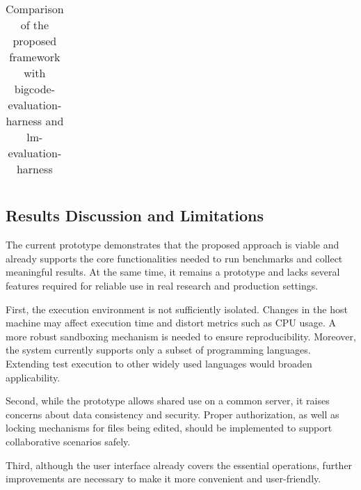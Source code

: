 \begin{longtable}{|p{2.3cm}|p{4.3cm}|p{4.3cm}|p{4.3cm}|}
\caption{Comparison of the proposed framework with bigcode-evaluation-harness and lm-evaluation-harness}
\label{tab:framework-comparison-with-proposed}
\end{longtable}





\subsection{Results Discussion and Limitations}

The current prototype demonstrates that the proposed approach is viable and already supports the core functionalities needed to run benchmarks and collect meaningful results.
At the same time, it remains a prototype and lacks several features required for reliable use in real research and production settings.

First, the execution environment is not sufficiently isolated.
Changes in the host machine may affect execution time and distort metrics such as CPU usage.
A more robust sandboxing mechanism is needed to ensure reproducibility.
Moreover, the system currently supports only a subset of programming languages.
Extending test execution to other widely used languages would broaden applicability.

Second, while the prototype allows shared use on a common server, it raises concerns about data consistency and security.
Proper authorization, as well as locking mechanisms for files being edited, should be implemented to support collaborative scenarios safely.

Third, although the user interface already covers the essential operations, further improvements are necessary to make it more convenient and user-friendly.

